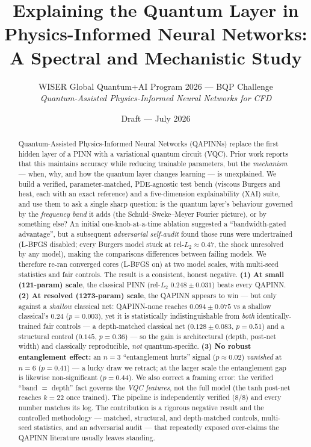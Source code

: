 \documentclass[11pt]{article}
\title{\textbf{Explaining the Quantum Layer in Physics-Informed Neural Networks:\\
A Spectral and Mechanistic Study}}
\author{WISER Global Quantum+AI Program 2026 --- BQP Challenge\\
\emph{Quantum-Assisted Physics-Informed Neural Networks for CFD}}
\date{Draft --- July 2026}
\begin{document}
\maketitle

\begin{abstract}
Quantum-Assisted Physics-Informed Neural Networks (QAPINNs) replace the first
hidden layer of a PINN with a variational quantum circuit (VQC). Prior work
reports that this maintains accuracy while reducing trainable parameters, but the
\emph{mechanism} --- when, why, and how the quantum layer changes learning --- is
unexplained. We build a verified, parameter-matched, PDE-agnostic test bench
(viscous Burgers and heat, each with an exact reference) and a five-dimension
explainability (XAI) suite, and use them to ask a single sharp question: is the
quantum layer's behaviour governed by the \emph{frequency band} it adds (the
Schuld--Sweke--Meyer Fourier picture), or by something else? An initial
one-knob-at-a-time ablation suggested a ``bandwidth-gated advantage'', but a
subsequent \emph{adversarial self-audit} found those runs were undertrained
(L-BFGS disabled; every Burgers model stuck at rel-$L_2\approx0.47$, the shock
unresolved by any model), making the comparisons differences between failing
models. We therefore re-ran converged cores (L-BFGS on) at two model scales, with
multi-seed statistics and fair controls. The result is a consistent, honest
negative. \textbf{(1) At small (121-param) scale}, the classical PINN
(rel-$L_2$ $0.248\!\pm\!0.031$) beats every QAPINN. \textbf{(2) At resolved
(1273-param) scale}, the QAPINN appears to win --- but only against a \emph{shallow}
classical net: QAPINN-none reaches $0.094\!\pm\!0.075$ vs a shallow classical's
$0.24$ ($p\!=\!0.003$), yet it is statistically indistinguishable from \emph{both}
identically-trained fair controls --- a depth-matched classical net
($0.128\!\pm\!0.083$, $p\!=\!0.51$) and a structural control ($0.145$, $p\!=\!0.36$)
--- so the gain is architectural (depth, post-net width) and classically
reproducible, \emph{not} quantum-specific.
\textbf{(3) No robust entanglement effect:} an $n\!=\!3$ ``entanglement hurts''
signal ($p\!\approx\!0.02$) \emph{vanished} at $n\!=\!6$ ($p\!=\!0.41$) --- a lucky
draw we retract; at the larger scale the entanglement gap is likewise
non-significant ($p\!=\!0.44$). We also correct a framing error: the verified
``band $=$ depth'' fact governs the \emph{VQC features}, not the full model (the
tanh post-net reaches $k\!=\!22$ once trained). The pipeline is independently
verified (8/8) and every number matches its log. The contribution is a rigorous
negative result and the controlled methodology --- matched, structural, and
depth-matched controls, multi-seed statistics, and an adversarial audit --- that
repeatedly exposed over-claims the QAPINN literature usually leaves standing.
\end{abstract}
\end{document}
